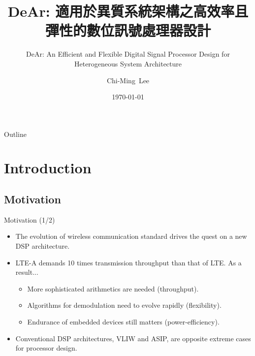 \documentclass{beamer}
\author{Chi-Ming~Lee}
\institute[NTHU EE] %
{
    Department of Electrial Engineering\\
    National Tsing Hua University
}
\date{\today}
\begin{document}
\begin{CJK}{UTF8}{bkai}

    \title[DeAr DSP]{ DeAr: 適用於異質系統架構之高效率且彈性的數位訊號處理器設計}
    \subtitle{DeAr: An Efficient and Flexible Digital Signal Processor Design for Heterogeneous System Architecture}

    \begin{frame}
        \titlepage
    \end{frame}

    \begin{frame}{Outline}
        \tableofcontents
    \end{frame}


    \section{Introduction}

    \subsection{Motivation}

    \begin{frame}{Motivation (1/2)}
        \begin{itemize}
            \item {
                    The evolution of wireless communication standard drives the quest on a new DSP architecture.
                }
            \item {
                    LTE-A demands 10 times transmission throughput than that of LTE. As a result...
                    \begin{itemize}
                        \item {
                                More sophisticated arithmetics are needed (throughput).
                            }
                        \item {
                                Algorithms for demodulation need to evolve rapidly (flexibility).
                        }
                        \item {
                                Endurance of embedded devices still matters (power-efficiency).
                        }
                    \end{itemize}
                }
            \item {
                    Conventional DSP architectures, VLIW and ASIP, are opposite extreme cases for processor design.
                }
        \end{itemize}
    \end{frame}


\end{CJK}
\end{document}
